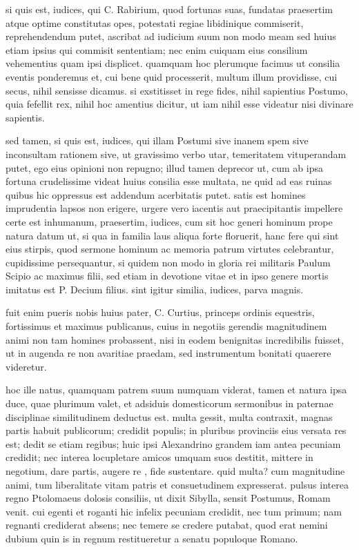 
 si quis est, iudices, qui C. Rabirium, quod fortunas suas, fundatas praesertim atque optime constitutas opes, potestati regiae libidinique commiserit, reprehendendum putet, ascribat ad iudicium suum non modo meam sed huius etiam ipsius qui commisit sententiam; nec enim cuiquam eius consilium vehementius quam ipsi displicet. quamquam hoc plerumque facimus ut consilia eventis ponderemus et, cui bene quid processerit, multum illum providisse, cui secus, nihil sensisse dicamus. si exstitisset in rege fides, nihil sapientius Postumo, quia fefellit rex, nihil hoc amentius dicitur, ut iam nihil esse videatur nisi divinare sapientis.

 sed tamen, si quis est, iudices, qui illam Postumi sive inanem spem sive inconsultam rationem sive, ut gravissimo verbo utar, temeritatem vituperandam putet, ego eius opinioni non repugno; illud tamen deprecor ut, cum ab ipsa fortuna crudelissime videat huius consilia esse multata, ne quid ad eas ruinas quibus hic oppressus est addendum acerbitatis putet. satis est homines imprudentia lapsos non erigere, urgere vero iacentis aut praecipitantis impellere certe est inhumanum, praesertim, iudices, cum sit hoc generi hominum prope natura datum ut, si qua in familia laus aliqua forte floruerit, hanc fere qui sint eius stirpis, quod sermone hominum ac memoria patrum virtutes celebrantur, cupidissime persequantur, si quidem non modo in gloria rei militaris Paulum Scipio ac maximus filii, sed etiam in devotione vitae et in ipso genere mortis imitatus est P. Decium filius. sint igitur similia, iudices, parva magnis.

 fuit enim pueris nobis huius pater, C. Curtius, princeps ordinis equestris, fortissimus et maximus publicanus, cuius in negotiis gerendis magnitudinem animi non tam homines probassent, nisi in eodem benignitas incredibilis fuisset, ut in augenda re non avaritiae praedam, sed instrumentum bonitati quaerere videretur.

 hoc ille natus, quamquam patrem suum numquam viderat, tamen et natura ipsa duce, quae plurimum valet, et adsiduis domesticorum sermonibus in paternae disciplinae similitudinem deductus est. multa gessit, multa contraxit, magnas partis habuit publicorum; credidit populis; in pluribus provinciis eius versata res est; dedit se etiam regibus; huic ipsi Alexandrino grandem iam antea pecuniam credidit; nec interea locupletare amicos umquam suos destitit, mittere in negotium, dare partis, augere re , fide sustentare. quid multa? cum magnitudine animi, tum liberalitate vitam patris et consuetudinem expresserat. pulsus interea regno Ptolomaeus dolosis consiliis, ut dixit Sibylla, sensit Postumus, Romam venit. cui egenti et roganti hic infelix pecuniam credidit, nec tum primum; nam regnanti crediderat absens; nec temere se credere putabat, quod erat nemini dubium quin is in regnum restitueretur a senatu populoque Romano.

